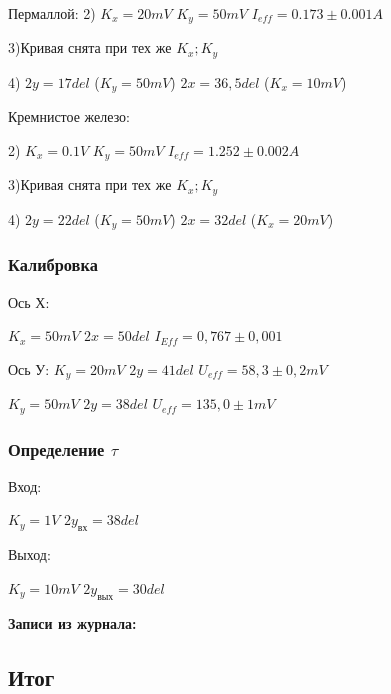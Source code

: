 \documentclass[a4paper,12pt]{article}
\begin{document}
Пермаллой:
2)
$K_x = 20mV$
$K_y = 50mV$
$I_{eff} = 0.173 \pm 0.001 A$

3)Кривая снята при тех же $K_x; K_y$

4)
$2y = 17 del$
($K_y = 50mV$)
$2x = 36,5 del$
($K_x = 10 mV$)

Кремнистое железо:

2)
$K_x = 0.1V$
$K_y = 50mV$
$I_{eff} = 1.252 \pm 0.002 A$

3)Кривая снята при тех же $K_x; K_y$

4)
$2y = 22 del$
($K_y = 50mV$)
$2x = 32 del$
($K_x = 20 mV$)


\subsubsection*{Калибровка}

Ось Х:

$K_x = 50mV$
$2x = 50 del$
$I_{Eff} = 0,767 \pm 0,001$

Ось У:
$K_y  =20 mV$
$2y = 41 del$
$U_{eff} = 58,3 \pm 0,2 mV$

$K_y  = 50 mV$
$2y = 38 del$
$U_{eff} = 135,0 \pm 1 mV$

\subsubsection*{Определение $\tau$}

Вход:

$K_y = 1V$
$2y_\text{вх} = 38 del$

Выход:

$K_y = 10mV$
$2y_\text{вых} = 30 del$

\bigskip

\textbf{Записи из журнала:}
\bigskip


\bigskip

\subsection*{Итог}
\bigskip
 
\end{document}
